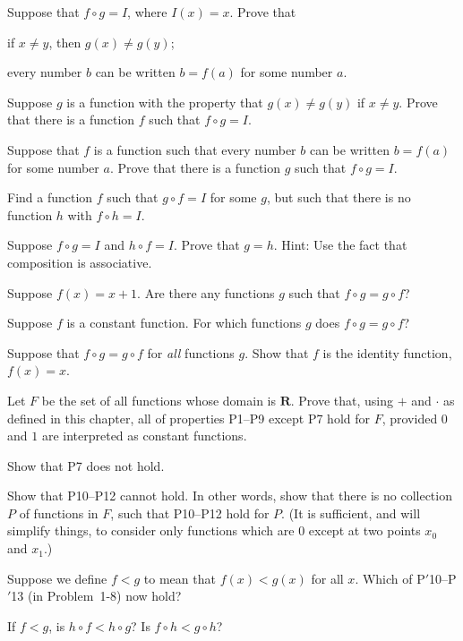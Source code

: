  Suppose that $f \circ g = I$, where $I(x)=x$. Prove that
\begin{letters}
\item if $x \neq y$, then $g(x) \neq g(y)$;
\item every number $b$ can be written $b=f(a)$ for some number $a$.
\end{letters}

\begin{letters}
\item Suppose $g$ is a function with the property that $g(x) \neq g(y)$ if
$x \neq y$. Prove that there is a function $f$ such that $f \circ g = I$.
\item Suppose that $f$ is a function such that every number $b$ can be written
$b=f(a)$ for some number $a$. Prove that there is a function $g$ such that
$f \circ g = I$.
\end{letters}

 Find a function $f$ such that $g \circ f = I$ for some $g$, but
such that there is no function $h$ with $f \circ h = I$.

 Suppose $f \circ g = I$ and $h \circ f = I$. Prove that $g=h$.
Hint: Use the fact that composition is associative.

\begin{letters}
\item Suppose $f(x)=x+1$. Are there any functions $g$ such that
$f \circ g = g \circ f$?
\item Suppose $f$ is a constant function. For which functions $g$ does
$f \circ g = g \circ f$?
\item Suppose that $f \circ g = g \circ f$ for \emph{all} functions $g$. Show
that $f$ is the identity function, $f(x)=x$.
\end{letters}

\begin{letters}
\item Let $F$ be the set of all functions whose domain is $\mathbf{R}$. Prove
that, using $+$ and $\cdot$ as defined in this chapter, all of properties
P1--P9 except P7 hold for $F$, provided $0$ and $1$ are interpreted as
constant functions.
\item Show that P7 does not hold.
\item[*(c)] Show that P10--P12 cannot hold. In other words, show that there
is no collection $P$ of functions in $F$, such that P10--P12 hold for $P$. (It
is sufficient, and will simplify things, to consider only functions which are
$0$ except at two points $x_0$ and $x_1$.)
\item[(d)] Suppose we define $f < g$ to mean that $f(x) < g(x)$ for all $x$.
Which of P$'$10--P$'$13 (in Problem~1-8) now hold?
\item[(e)] If $f < g$, is $h \circ f < h \circ g$? Is $f \circ h < g \circ h$?
\end{letters}

